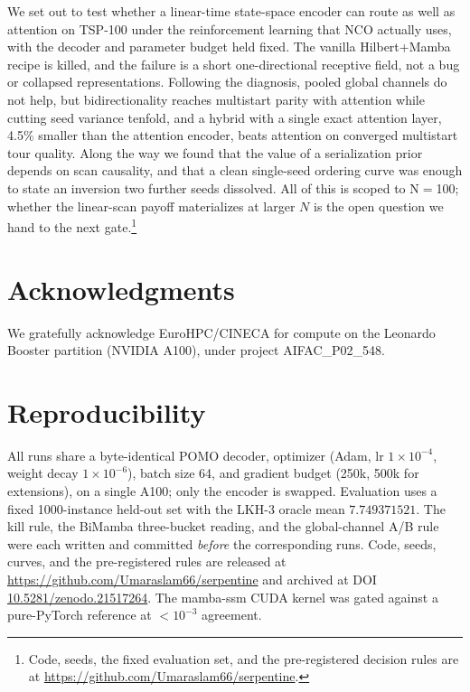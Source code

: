 \documentclass[11pt]{article}
\newcommand{\pct}{\%}
\begin{document}
We set out to test whether a linear-time state-space encoder can route as well as
attention on TSP-100 under the reinforcement learning that NCO actually uses, with
the decoder and parameter budget held fixed. The vanilla Hilbert+Mamba recipe is
killed, and the failure is a short one-directional receptive field, not a bug or
collapsed representations. Following the diagnosis, pooled global channels do not
help, but bidirectionality reaches multistart parity with attention while cutting
seed variance tenfold, and a hybrid with a single exact attention layer, 4.5\pct{}
smaller than the attention encoder, beats attention on converged multistart tour
quality. Along the way we found that the value of a serialization prior depends on
scan causality, and that a clean single-seed ordering curve was enough to state an
inversion two further seeds dissolved. All of this is scoped to N$=$100; whether
the linear-scan payoff materializes at larger $N$ is the open question we hand to
the next gate.\footnote{Code, seeds, the fixed evaluation set, and the
pre-registered decision rules are at
\url{https://github.com/Umaraslam66/serpentine}.}

\section*{Acknowledgments}
We gratefully acknowledge EuroHPC/CINECA for compute on the Leonardo Booster
partition (NVIDIA A100), under project AIFAC\_P02\_548.

\section*{Reproducibility}
All runs share a byte-identical POMO decoder, optimizer (Adam, lr
$1\times10^{-4}$, weight decay $1\times10^{-6}$), batch size 64, and gradient
budget (250k, 500k for extensions), on a single A100; only the encoder is
swapped. Evaluation uses a fixed 1000-instance held-out set with the LKH-3 oracle
mean $7.749371521$. The kill rule, the BiMamba three-bucket reading, and the
global-channel A/B rule were each written and committed \emph{before} the
corresponding runs. Code, seeds, curves, and the pre-registered rules are released at
\url{https://github.com/Umaraslam66/serpentine} and archived at
DOI \href{https://doi.org/10.5281/zenodo.21517264}{10.5281/zenodo.21517264}. The mamba-ssm CUDA kernel was
gated against a pure-PyTorch reference at $<10^{-3}$ agreement.



\end{document}
